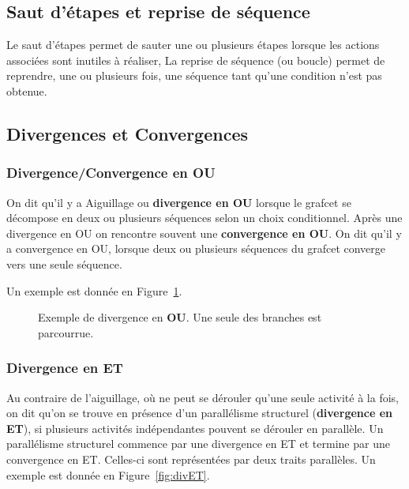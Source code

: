 \subsection{Saut d'étapes et reprise de séquence}
Le saut d'étapes permet de sauter une ou plusieurs étapes lorsque les actions associées sont inutiles à réaliser, La reprise de séquence (ou boucle) permet de reprendre, une ou plusieurs fois, une séquence tant qu'une condition n'est pas obtenue.


\subsection{Divergences et Convergences}
\subsubsection{Divergence/Convergence en OU}
On dit qu'il y a Aiguillage ou \textbf{divergence en OU} lorsque le grafcet se décompose en deux ou plusieurs séquences selon un choix conditionnel. Après une divergence en OU on rencontre souvent une \textbf{convergence en OU}. On dit qu'il y a convergence en OU, lorsque deux ou plusieurs séquences du grafcet converge vers une seule séquence.

 Un exemple est donnée en Figure~\ref{fig:divOU}.


\begin{figure}[ht]
  \centering
  
  \caption{Exemple de divergence en \textbf{OU}. Une seule des branches est parcourrue.}
  \label{fig:divOU}
\end{figure}


\subsubsection{Divergence en ET}
Au contraire de l'aiguillage, où ne peut se dérouler qu'une seule activité à la fois, on dit qu'on se trouve en présence d'un parallélisme structurel (\textbf{divergence en ET}), si plusieurs activités indépendantes pouvent se dérouler en parallèle. Un parallélisme structurel commence par une divergence en ET et termine par une convergence en ET. Celles-ci sont représentées par deux traits parallèles. Un exemple est donnée en Figure~\ref{fig:divET}.

